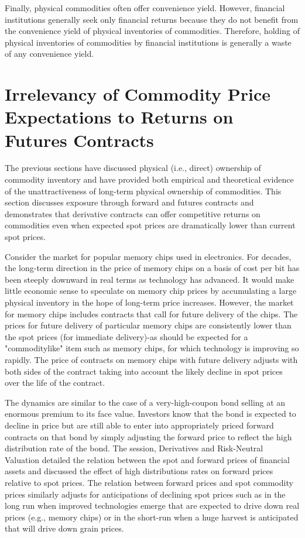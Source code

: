 \documentclass[11pt]{article}
\begin{document}
Finally, physical commodities often offer convenience yield. However, financial institutions generally seek only financial returns because they do not benefit from the convenience yield of physical inventories of commodities. Therefore, holding of physical inventories of commodities by financial institutions is generally a waste of any convenience yield.

\section*{Irrelevancy of Commodity Price Expectations to Returns on Futures Contracts}
The previous sections have discussed physical (i.e., direct) ownership of commodity inventory and have provided both empirical and theoretical evidence of the unattractiveness of long-term physical ownership of commodities. This section discusses exposure through forward and futures contracts and demonstrates that derivative contracts can offer competitive returns on commodities even when expected spot prices are dramatically lower than current spot prices.

Consider the market for popular memory chips used in electronics. For decades, the long-term direction in the price of memory chips on a basis of cost per bit has been steeply downward in real terms as technology has advanced. It would make little economic sense to speculate on memory chip prices by accumulating a large physical inventory in the hope of long-term price increases. However, the market for memory chips includes contracts that call for future delivery of the chips. The prices for future delivery of particular memory chips are consistently lower than the spot prices (for immediate delivery)-as should be expected for a "commoditylike" item such as memory chips, for which technology is improving so rapidly. The price of contracts on memory chips with future delivery adjusts with both sides of the contract taking into account the likely decline in spot prices over the life of the contract.

The dynamics are similar to the case of a very-high-coupon bond selling at an enormous premium to its face value. Investors know that the bond is expected to decline in price but are still able to enter into appropriately priced forward contracts on that bond by simply adjusting the forward price to reflect the high distribution rate of the bond. The session, Derivatives and Risk-Neutral Valuation detailed the relation between the spot and forward prices of financial assets and discussed the effect of high distributions rates on forward prices relative to spot prices. The relation between forward prices and spot commodity prices similarly adjusts for anticipations of declining spot prices such as in the long run when improved technologies emerge that are expected to drive down real prices (e.g., memory chips) or in the short-run when a huge harvest is anticipated that will drive down grain prices.
\end{document}
